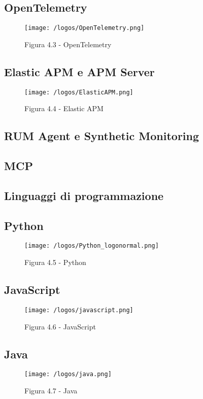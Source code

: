 \subsection*{OpenTelemetry}
\begin{figure}[H] 
    \centering 
    \texttt{[image: /logos/OpenTelemetry.png]} 
    \caption{Figura 4.3 - OpenTelemetry}
\end{figure}


\subsection*{Elastic APM e APM Server}
\begin{figure}[H] 
    \centering 
    \texttt{[image: /logos/ElasticAPM.png]} 
    \caption{Figura 4.4 - Elastic APM}
\end{figure}


\subsection*{RUM Agent e Synthetic Monitoring}


\subsection*{MCP}


\subsection{Linguaggi di programmazione}
\subsection*{Python}
\begin{figure}[H] 
    \centering 
    \texttt{[image: /logos/Python\_logonormal.png]} 
    \caption{Figura 4.5 - Python}
\end{figure}


\subsection*{JavaScript}
\begin{figure}[H] 
    \centering 
    \texttt{[image: /logos/javascript.png]} 
    \caption{Figura 4.6 - JavaScript}
\end{figure}


\subsection*{Java}
\begin{figure}[H] 
    \centering 
    \texttt{[image: /logos/java.png]} 
    \caption{Figura 4.7 - Java}
\end{figure}


